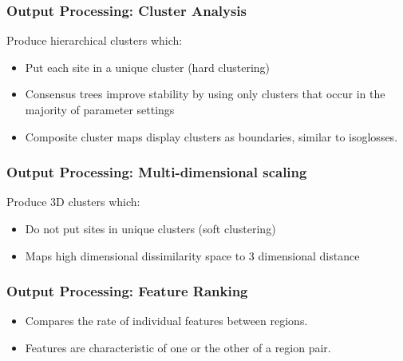 \documentclass{beamer}
\begin{document}
\begin{frame}
  \frametitle{Output Processing: Cluster Analysis}
  Produce hierarchical clusters which:
  \begin{itemize}
  \item Put each site in a unique cluster (hard clustering)
  \item Consensus trees improve stability by using only clusters that
    occur in the majority of parameter settings
  \item Composite cluster maps display clusters as boundaries, similar
    to isoglosses.
  \end{itemize}
\end{frame}
\begin{frame}
  \frametitle{Output Processing: Multi-dimensional scaling}
  Produce 3D clusters which:
  \begin{itemize}
  \item Do not put sites in unique clusters (soft clustering)
  \item Maps high dimensional dissimilarity space to 3 dimensional distance
 \end{itemize}
\end{frame}
\begin{frame}
  \frametitle{Output Processing: Feature Ranking}
  \begin{itemize}
  \item Compares the rate of individual features between regions.
  \item Features are characteristic of one or the other of a region
    pair.
  \end{itemize}
\end{frame}
\end{document}
